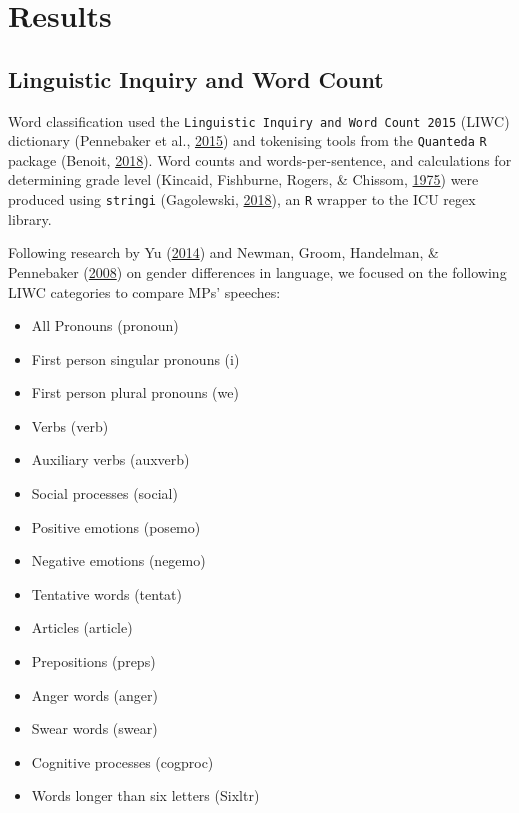 \documentclass[]{article}
\providecommand{\tightlist}{%
  \setlength{\itemsep}{0pt}\setlength{\parskip}{0pt}}
\theoremstyle{definition}
\theoremstyle{definition}
\theoremstyle{definition}
\theoremstyle{remark}
\begin{document}
\hypertarget{results}{%
\section{Results}\label{results}}

\hypertarget{linguistic-inquiry-and-word-count}{%
\subsection{Linguistic Inquiry and Word
Count}\label{linguistic-inquiry-and-word-count}}

Word classification used the
\texttt{Linguistic\ Inquiry\ and\ Word\ Count\ 2015} (LIWC) dictionary
(Pennebaker et al., \protect\hyperlink{ref-pennebaker2015}{2015}) and
tokenising tools from the \texttt{Quanteda} \texttt{R} package (Benoit,
\protect\hyperlink{ref-benoit2018}{2018}). Word counts and
words-per-sentence, and calculations for determining grade level
(Kincaid, Fishburne, Rogers, \& Chissom,
\protect\hyperlink{ref-kincaid1975}{1975}) were produced using
\texttt{stringi} (Gagolewski,
\protect\hyperlink{ref-gagolewski2018}{2018}), an \texttt{R} wrapper to
the ICU regex library.

Following research by Yu (\protect\hyperlink{ref-yu2014}{2014}) and
Newman, Groom, Handelman, \& Pennebaker
(\protect\hyperlink{ref-newman2008}{2008}) on gender differences in
language, we focused on the following LIWC categories to compare MPs'
speeches:

\begin{itemize}
\tightlist
\item
  All Pronouns (pronoun)
\item
  First person singular pronouns (i) 
\item
  First person plural pronouns (we)
\item
  Verbs (verb)
\item
  Auxiliary verbs (auxverb) 
\item
  Social processes (social) 
\item
  Positive emotions (posemo) 
\item
  Negative emotions (negemo) 
\item
  Tentative words (tentat)
\item
  Articles (article) 
\item
  Prepositions (preps) 
\item
  Anger words (anger)
\item
  Swear words (swear)
\item
  Cognitive processes (cogproc)
\item
  Words longer than six letters (Sixltr)
\end{itemize}
\end{document}
